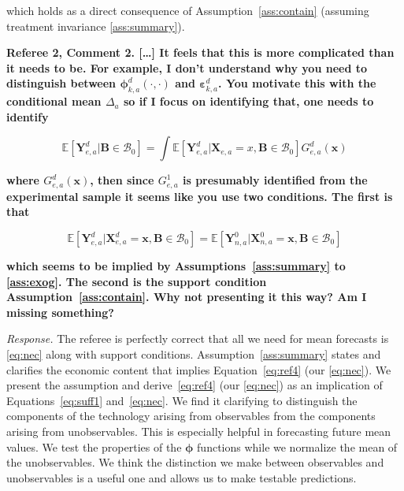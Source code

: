 which holds as a direct consequence of Assumption~\ref{ass:contain} (assuming treatment invariance \ref{ass:summary}).

\noindent \textbf{Referee 2, Comment 2. [\ldots] It feels that this is more complicated than it needs to be. For example, I don't understand why you need to distinguish between $\bm{\phi}_{k,a}^d \left( \cdot, \cdot \right) $ and $\bm{\varepsilon}_{k,a}^d$. You motivate this with the conditional mean $\Delta_a$ so if I focus on identifying that, one needs to identify}

\begin{equation}
\mathbb{E} \left[ \bm{Y}_{e,a}^d | \bm{B} \in \mathcal{B}_0 \right] = \int \mathbb{E} \left[ \bm{Y}_{e,a}^d | \bm{X}_{e,a} = x, \bm{B} \in \mathcal{B}_0 \right] G_{e,a}^d \left( \bm{x} \right)
\end{equation}

\textbf{where $G_{e,a}^d \left( \bm{x} \right)$, then since $G_{e,a}^1$ is presumably identified from the experimental sample it seems like you use two conditions. The first is that}

\begin{equation}
\mathbb{E} \left[  \bm{Y}_{e,a}^d | \bm{X}_{e,a}^d = \bm{x},  \bm{B} \in \mathcal{B}_0 \right] = \mathbb{E} \left[  \bm{Y}_{n,a}^0 | \bm{X}_{n,a}^0 = \bm{x},  \bm{B} \in \mathcal{B}_0 \right]  \label{eq:ref4}
\end{equation}

\textbf{which seems to be implied by Assumptions~\ref{ass:summary} to \ref{ass:exog}. The second is the support condition Assumption~\ref{ass:contain}. Why not presenting it this way? Am I missing something?}

\noindent \textit{Response.} The referee is perfectly correct that all we need for mean forecasts is \eqref{eq:nec} along with support conditions. Assumption~\ref{ass:summary} states and clarifies the economic content that implies Equation~\eqref{eq:ref4} (our \eqref{eq:nec}). We present the assumption and derive~\eqref{eq:ref4} (our \eqref{eq:nec}) as an implication of Equations~\eqref{eq:suff1} and~\eqref{eq:nec}. We find it clarifying to distinguish the components of the technology arising from observables from the components arising from unobservables. This is especially helpful in forecasting future mean values. We test the properties of the $\bm{\phi}$ functions while we normalize the mean of the unobservables. We think the distinction we make between observables and unobservables is a useful one and allows us to make testable predictions.

